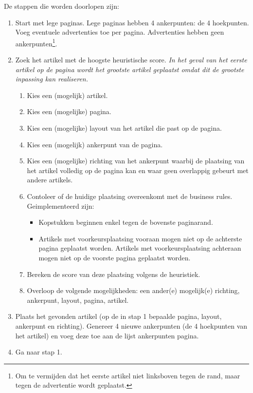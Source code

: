 \documentclass[a4paper,12pt]{report}
\begin{document}
De stappen die worden doorlopen zijn:
\begin{enumerate}
	\item[] Start met lege paginas. Lege paginas hebben 4 ankerpunten: de 4 hoekpunten. Voeg eventuele advertenties toe per pagina. Advertenties hebben geen ankerpunten\footnote{Om te vermijden dat het eerste artikel niet linksboven tegen de rand, maar tegen de advertentie wordt geplaatst.}.
	\item Zoek het artikel met de hoogste heuristische score. \textit{In het geval van het eerste artikel op de pagina wordt het grootste artikel geplaatst omdat dit de grootste inpassing kan realiseren.}
	
	\begin{enumerate}
		\item Kies een (mogelijk) artikel.
		\item Kies een (mogelijke) pagina.
		\item Kies een (mogelijke) layout van het artikel die past op de pagina.
		\item Kies een (mogelijk) ankerpunt van de pagina.
		\item Kies een (mogelijke) richting van het ankerpunt waarbij de plaatsing van het artikel volledig op de pagina kan en waar geen overlappig gebeurt met andere artikels.
		\item Contoleer of de huidige plaatsing overeenkomt met de business rules. Geimplementeerd zijn:
			\begin{itemize}
				\item Kopstukken beginnen enkel tegen de bovenste paginarand.
				\item Artikels met voorkeursplaatsing vooraan mogen niet op de achterste pagina geplaatst worden. Artikels met voorkeursplaatsing achteraan mogen niet op de voorste pagina geplaatst worden.
			\end{itemize}
		\item Bereken de score van deze plaatsing volgens de heuristiek.
		\item Overloop de volgende mogelijkheden: een ander(e) mogelijk(e) richting, ankerpunt, layout, pagina, artikel.
	\end{enumerate}
	
	\item Plaats het gevonden artikel (op de in stap 1 bepaalde pagina, layout, ankerpunt en richting). Genereer 4 nieuwe ankerpunten (de 4 hoekpunten van het artikel) en voeg deze toe aan de lijst ankerpunten pagina.
	
	\item Ga naar stap 1.
\end{enumerate}
\end{document}
